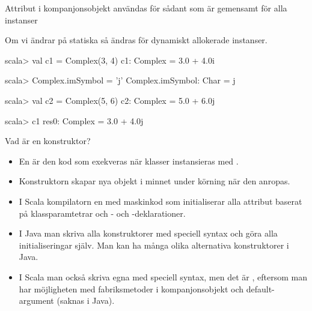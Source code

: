 \begin{Slide}{Attribut i kompanjonsobjekt användas för sådant som är gemensamt för alla instanser}

Om vi ändrar på statiska  så ändras  för  dynamiskt allokerade instanser.
\begin{REPLnonum}
scala> val c1 = Complex(3, 4)
c1: Complex = 3.0 + 4.0i

scala> Complex.imSymbol = 'j'
Complex.imSymbol: Char = j

scala> val c2 = Complex(5, 6)
c2: Complex = 5.0 + 6.0j

scala> c1
res0: Complex = 3.0 + 4.0j
\end{REPLnonum}
\end{Slide}







\begin{Slide}{Vad är en konstruktor?}
\begin{itemize}
\item En  är den kod som exekveras när klasser instansieras med .

\item Konstruktorn skapar nya objekt i minnet under körning när den anropas. 

\item I Scala  kompilatorn en  med maskinkod som initialiserar alla attribut baserat på klassparamtetrar och - och -deklarationer. 

\item I Java  man  skriva alla konstruktorer med speciell syntax och göra alla initialiseringar själv. Man kan ha många olika alternativa konstruktorer i Java.

\item I Scala  man också skriva egna  med speciell syntax, men det är , eftersom man har möjligheten med fabriksmetoder i kompanjonsobjekt och default-argument (saknas i Java). 
\end{itemize}
\end{Slide}


